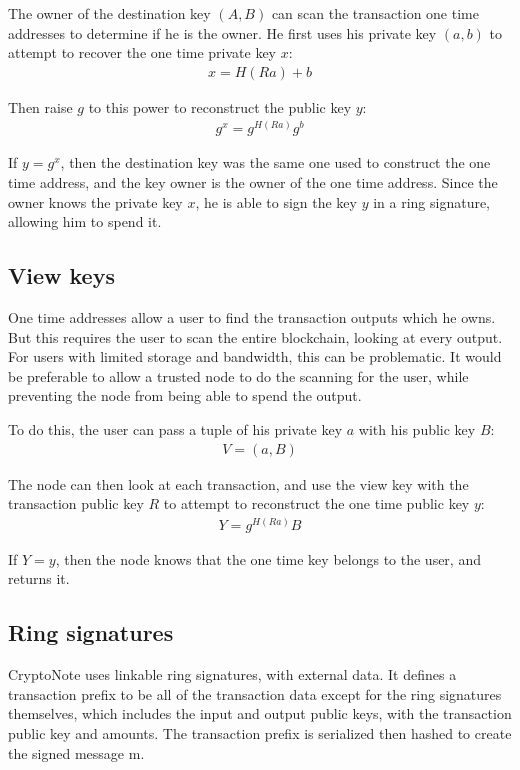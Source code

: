 \documentclass{article}
\begin{document}
The owner of the destination key $(A, B)$ can scan the transaction one time addresses to determine if he is the owner.  He first uses his private key $(a, b)$ to attempt to recover the one time private key $x$:
\begin{align}
	x = H(Ra) + b
\end{align}

Then raise $g$ to this power to reconstruct the public key $y$:
\begin{align}
  g^x = g^{H(Ra)} g^b
\end{align}

If $y = g^x$, then the destination key was the same one used to construct the one time address, and the key owner is the owner of the one time address.  Since the owner knows the private key $x$, he is able to sign the key $y$ in a ring signature, allowing him to spend it.


\subsection{View keys}

One time addresses allow a user to find the transaction outputs which he owns.  But this requires the user to scan the entire blockchain, looking at every output.  For users with limited storage and bandwidth, this can be problematic.  It would be preferable to allow a trusted node to do the scanning for the user, while preventing the node from being able to spend the output.

To do this, the user can pass a tuple of his private key $a$ with his public key $B$:
\begin{align}
  V = (a, B)
\end{align}

The node can then look at each transaction, and use the view key with the transaction public key $R$ to attempt to reconstruct the one time public key $y$:
\begin{align}
  Y = g^{H(Ra)} B
\end{align}

If $Y = y$, then the node knows that the one time key belongs to the user, and returns it.


\subsection{Ring signatures}

CryptoNote uses linkable ring signatures, with external data.  It defines a transaction prefix to be all of the transaction data except for the ring signatures themselves, which includes the input and output public keys, with the transaction public key and amounts.  The transaction prefix is serialized then hashed to create the signed message m.
\end{document}
